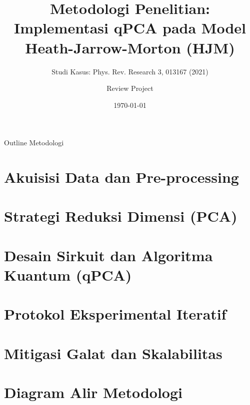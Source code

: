\documentclass[10pt, aspectratio=169]{beamer}
\title{Metodologi Penelitian: Implementasi qPCA pada Model Heath-Jarrow-Morton (HJM)}
\subtitle{Studi Kasus: Phys. Rev. Research 3, 013167 (2021)}
\author{Review Project}
\date{\today}
\begin{document}
\maketitle

\begin{frame}{Outline Metodologi}
    \tableofcontents
\end{frame}

\section{Akuisisi Data dan Pre-processing}


\section{Strategi Reduksi Dimensi (PCA)}


\section{Desain Sirkuit dan Algoritma Kuantum (qPCA)}


\section{Protokol Eksperimental Iteratif}


\section{Mitigasi Galat dan Skalabilitas}


\section{Diagram Alir Metodologi}

\end{document}
